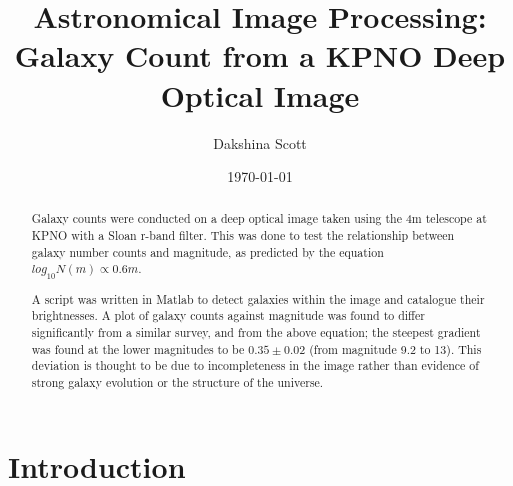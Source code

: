 \documentclass[a4paper,11pt,twoside]{article}
\begin{document}
\title{Astronomical Image Processing: Galaxy Count from a KPNO Deep 
Optical Image}
\date{\today\\[4cm]}
\author{Dakshina Scott}
\maketitle






\begin{abstract}

Galaxy counts were conducted on a deep optical image taken using the 
4m telescope at KPNO with a Sloan r-band filter. This was done to 
test the relationship between galaxy number counts and magnitude, 
as predicted by the equation \(log_{10} N(m) \propto 0.6m\).


A script was written in Matlab to detect galaxies within the 
image and catalogue their brightnesses. A plot of galaxy counts 
against magnitude was found to differ significantly from a similar 
survey, and from the above equation; the steepest gradient was 
found at the lower magnitudes to be \(0.35 \pm 0.02\) (from magnitude 
9.2 to 13). This deviation is thought to be due to incompleteness in the image rather 
than evidence of strong galaxy evolution or the structure of 
the universe.

\end{abstract}




\section{Introduction}
\end{document}
